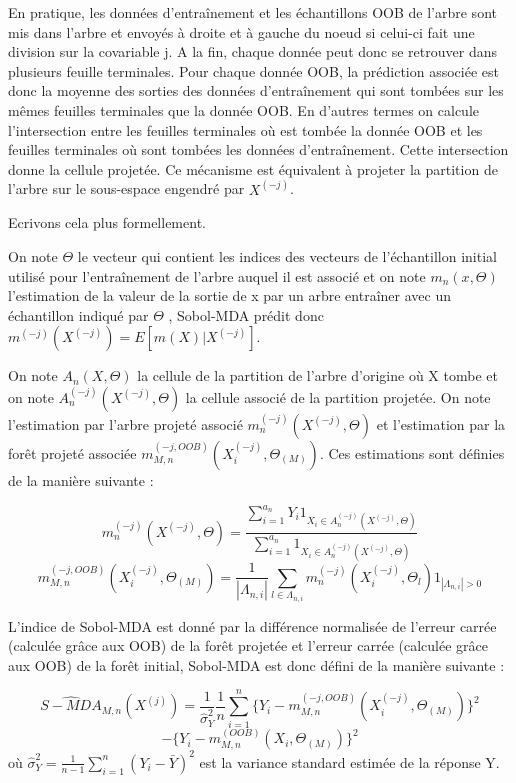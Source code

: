 \documentclass[
]{article}
\begin{document}
En pratique, les données d'entraînement et les échantillons OOB de
l'arbre sont mis dans l'arbre et envoyés à droite et à gauche du noeud
si celui-ci fait une division sur la covariable j. A la fin, chaque
donnée peut donc se retrouver dans plusieurs feuille terminales. Pour
chaque donnée OOB, la prédiction associée est donc la moyenne des
sorties des données d'entraînement qui sont tombées sur les mêmes
feuilles terminales que la donnée OOB. En d'autres termes on calcule
l'intersection entre les feuilles terminales où est tombée la donnée OOB
et les feuilles terminales où sont tombées les données d'entraînement.
Cette intersection donne la cellule projetée. Ce mécanisme est
équivalent à projeter la partition de l'arbre sur le sous-espace
engendré par \(X^{(-j)}\).

Ecrivons cela plus formellement.

On note \(\Theta\) le vecteur qui contient les indices des vecteurs de
l'échantillon initial utilisé pour l'entraînement de l'arbre auquel il
est associé et on note \(m_n(x,\Theta)\) l'estimation de la valeur de la
sortie de x par un arbre entraîner avec un échantillon indiqué par
\(\Theta\) , Sobol-MDA prédit donc
\(m^{(-j)}(X^{(-j)})=E[m(X)|X^{(-j)}]\).

On note \(A_n(X,\Theta)\) la cellule de la partition de l'arbre
d'origine où X tombe et on note \(A_n^{(-j)}(X^{(-j)},\Theta)\) la
cellule associé de la partition projetée. On note l'estimation par
l'arbre projeté associé \(m_n^{(-j)}(X^{(-j)},\Theta)\) et l'estimation
par la forêt projeté associée
\(m_{M,n}^{(-j,OOB)}(X_i^{(-j)},\Theta_{(M)})\). Ces estimations sont
définies de la manière suivante :

\[m_n^{(-j)}(X^{(-j)},\Theta)=\frac{\sum_{i=1}^{a_n} Y_i 1_{X_i \in A_n^{(-j)}(X^{(-j)},\Theta)}}{\sum_{i=1}^{a_n} 1_{X_i \in A_n^{(-j)}(X^{(-j)},\Theta)}}\]
\[m_{M,n}^{(-j,OOB)}(X_i^{(-j)},\Theta_{(M)})=\frac{1}{|\Lambda_{n,i}|} \sum_{l \in \Lambda_{n,i}} m^{(-j)}_{n}(X^{(-j)}_i, \Theta_l)1_{|\Lambda_{n,i}|>0}
\]

L'indice de Sobol-MDA est donné par la différence normalisée de l'erreur
carrée (calculée grâce aux OOB) de la forêt projetée et l'erreur carrée
(calculée grâce aux OOB) de la forêt initial, Sobol-MDA est donc défini
de la manière suivante :

\[\widehat{S-MDA}_{M,n}(X^{(j)})=\frac{1}{\hat{\sigma}^2_Y}\frac{1}{n}\sum^{n}_{i=1}\{Y_i-m_{M,n}^{(-j,OOB)}(X_i^{(-j)},\Theta_{(M)})\}^2\]
\[-\{Y_i-m_{M,n}^{(OOB)}(X_i,\Theta_{(M)})\}^2\] où
\(\hat{\sigma}^2_Y=\frac{1}{n-1}\sum^{n}_{i=1}(Y_i-\bar{Y})^2\) est la
variance standard estimée de la réponse Y.
\end{document}

